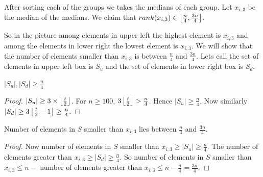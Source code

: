 After sorting each of the groups we takes the medians of each group. Let $x_{i,3}$ be the median of the medians. We claim that $rank(x_{i,3})\in  \left[\frac{n}{4},\frac{3n}{4}\right]$. 

\begin{algorithm}
	\DontPrintSemicolon
\caption{$(S)$}
\end{algorithm}

So in the picture among elements in upper left the highest element is $x_{i,3}$ and among the elements in lower right the lowest element is $x_{i,3}$. We will show that the number of elements smaller than $x_{i,3}$ is between $\frac{n}{4} $ and $\frac{3n}{4}$. Lets call the set of elements in upper left box is $S_u$ and the set of elements in lower right box is $S_d$.

\begin{lemma}{}{}
	$|S_u|,|S_d|\geq\frac{n}{4}$
\end{lemma}
\begin{proof}
	$|S_u|\geq 3\times \left\lfloor\frac{t}{2}\right\rfloor$. For $n\geq 100$, $3\left\lfloor\frac{t}{2}\right\rfloor> \frac{n}{4}$. Hence $|S_u|\geq \frac{n}{4}$. Now similarly $|S_d|\geq 3\left\lfloor\frac{t}{2}-1\right\rfloor\geq \frac{n}{4}$.
\end{proof}
\begin{lemma}{}{}
	Number of elements in $S$ smaller than $x_{i,3}$ lies between $\frac{n}4$ and $\frac{3n}{4}$.
\end{lemma}
\begin{proof}
	Now number of elements in $S$ smaller than $x_{i,3}\geq |S_u|\geq \frac{n}4$. The number of elements greater than $x_{i,3}\geq |S_d|\geq \frac{n}{4}$. So number of elements in $S$ smaller than $x_{i,3}\leq n-$ number of elements greater than $x_{i,3}\leq n-\frac{n}4=\frac{3n}{4}$.
\end{proof}